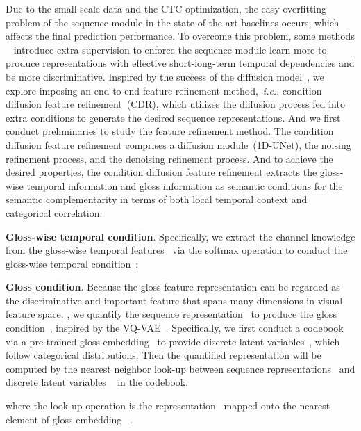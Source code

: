 \documentclass[sigconf]{acmart}
\begin{document}
Due to the small-scale data and the CTC optimization, the easy-overfitting problem of the sequence module in the state-of-the-art baselines occurs, which affects the final prediction performance. 
To overcome this problem, some methods ~\cite{pu2019iterative, pu2020boosting, cheng2020fully, min2021visual,hao2021self, zuo2022c2slr} introduce extra supervision to enforce the sequence module learn more to produce representations with effective short-long-term temporal dependencies and be more discriminative.
Inspired by the success of the diffusion model~\cite{2022imagen,Ramesh2022HierarchicalTI,2022StableDiffusion,Ho2022VideoDM,Ho2022ImagenVH,Ruan2022MMDiffusionLM,He2022DiffusionBERTIG,Le2023MaskDiffMM,han2022card}, we explore imposing an end-to-end feature refinement method,~\textit{i.e.}, condition diffusion feature refinement~(CDR), which utilizes the diffusion process fed into extra conditions to generate the desired sequence representations. 
And we first conduct preliminaries to study the feature refinement method. 
The condition diffusion feature refinement comprises a diffusion module~(1D-UNet), the noising refinement process, and the denoising refinement process.
And to achieve the desired properties, the condition diffusion feature refinement extracts the gloss-wise temporal information and gloss information as semantic conditions for the semantic complementarity in terms of both local temporal context and categorical correlation.



\noindent \textbf{Gloss-wise temporal condition}. Specifically, we extract the channel knowledge from the gloss-wise temporal features~ via the softmax operation to conduct the gloss-wise temporal condition~:



\noindent \textbf{Gloss condition}.
Because the gloss feature representation can be regarded as the discriminative and important feature that spans many dimensions in visual feature space. 
, we quantify the sequence representation~ to produce the gloss condition~, inspired by the VQ-VAE~\cite{VQVAE2017}. 
Specifically, we first conduct a codebook via a pre-trained gloss embedding~\cite{chen2022two} to provide discrete latent variables~, which follow categorical distributions. 
Then the quantified representation  will be computed by the nearest neighbor look-up between  sequence representations~ and discrete latent variables ~ in the codebook.

where the look-up operation is the representation~  mapped onto the nearest element of gloss embedding ~.
\end{document}
